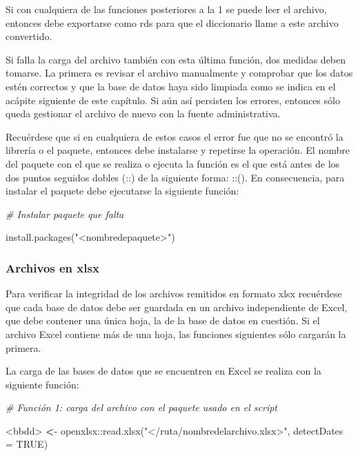 \documentclass[
  spanish,
]{book}
\newenvironment{Shaded}{\begin{snugshade}}{\end{snugshade}}
\newcommand{\AttributeTok}[1]{\textcolor[rgb]{0.77,0.63,0.00}{#1}}
\newcommand{\CommentTok}[1]{\textcolor[rgb]{0.56,0.35,0.01}{\textit{#1}}}
\newcommand{\ConstantTok}[1]{\textcolor[rgb]{0.00,0.00,0.00}{#1}}
\newcommand{\ErrorTok}[1]{\textcolor[rgb]{0.64,0.00,0.00}{\textbf{#1}}}
\newcommand{\FunctionTok}[1]{\textcolor[rgb]{0.00,0.00,0.00}{#1}}
\newcommand{\NormalTok}[1]{#1}
\newcommand{\SpecialCharTok}[1]{\textcolor[rgb]{0.00,0.00,0.00}{#1}}
\newcommand{\StringTok}[1]{\textcolor[rgb]{0.31,0.60,0.02}{#1}}
\begin{document}
Si con cualquiera de las funciones posteriores a la 1 se puede leer el archivo, entonces debe exportarse como rds para que el diccionario llame a este archivo convertido.

Si falla la carga del archivo también con esta última función, dos medidas deben tomarse. La primera es revisar el archivo manualmente y comprobar que los datos estén correctos y que la base de datos haya sido limpiada como se indica en el acápite siguiente de este capítulo. Si aún así persisten los errores, entonces sólo queda gestionar el archivo de nuevo con la fuente administrativa.

Recuérdese que si en cualquiera de estos casos el error fue que no se encontró la librería o el paquete, entonces debe instalarse y repetirse la operación. El nombre del paquete con el que se realiza o ejecuta la función es el que está antes de los dos puntos seguidos dobles (::) de la siguiente forma: ::(). En consecuencia, para instalar el paquete debe ejecutarse la siguiente función:

\begin{Shaded}
\begin{Highlighting}[]
\CommentTok{\# Instalar paquete que falta}

\FunctionTok{install.packages}\NormalTok{(}\StringTok{"\textless{}nombredepaquete\textgreater{}"}\NormalTok{)}
\end{Highlighting}
\end{Shaded}

\hypertarget{archivos-en-xlsx}{%
\subsubsection{Archivos en xlsx}\label{archivos-en-xlsx}}

Para verificar la integridad de los archivos remitidos en formato xlsx recuérdese que cada base de datos debe ser guardada en un archivo independiente de Excel, que debe contener una única hoja, la de la base de datos en cuestión. Si el archivo Excel contiene más de una hoja, las funciones siguientes sólo cargarán la primera.

La carga de las bases de datos que se encuentren en Excel se realiza con la siguiente función:

\begin{Shaded}
\begin{Highlighting}[]
\CommentTok{\# Función 1: carga del archivo con el paquete usado en el script }

\SpecialCharTok{\textless{}}\NormalTok{bbdd}\SpecialCharTok{\textgreater{}} \ErrorTok{\textless{}}\SpecialCharTok{{-}}\NormalTok{ openxlsx}\SpecialCharTok{::}\FunctionTok{read.xlsx}\NormalTok{(}\StringTok{"\textless{}/ruta/nombredelarchivo.xlsx\textgreater{}"}\NormalTok{,  }\AttributeTok{detectDates =} \ConstantTok{TRUE}\NormalTok{)}
\end{Highlighting}
\end{Shaded}
\end{document}
